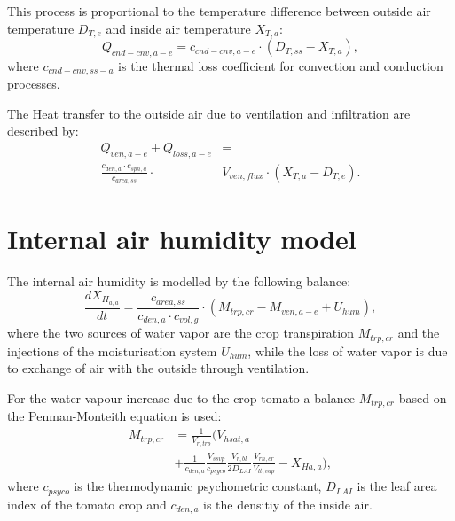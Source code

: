 This process is proportional to the temperature difference between outside air temperature $D_{T,e}$ and inside air temperature $X_{T,a}$:
\begin{equation}\label{eq:a-e}
Q_{cnd-cnv,a-e} = c_{cnd-cnv,a-e} \cdot (D_{T,ss}-X_{T,a}),
\end{equation}
where $c_{cnd-cnv,ss-a}$ is the thermal loss coefficient for convection and conduction processes.

The Heat transfer to the outside air due to ventilation and infiltration are described by:
\begin{equation}\label{eq:loss}
\begin{split}
Q_{ven,a-e} + Q_{loss,a-e}& = \\
\frac{c_{den,a} \cdot c_{sph,a}}{c_{area,ss}} \cdot &V_{ven,flux} \cdot (X_{T,a}-D_{T,e}).
\end{split}
\end{equation}

\section{Internal air humidity model}
\label{sec:hum}
The internal air humidity is modelled by the following balance:
\begin{equation}\label{eq:hum}
\frac{dX_{H_{a,a}}}{dt} = \frac{c_{area,ss}}{c_{den,a} \cdot c_{vol,g}} \cdot \left(M_{trp,cr}-M_{ven,a-e}+U_{hum}\right),
\end{equation}
where the two sources of water vapor are the crop transpiration $M_{trp,cr}$ and the injections of the moisturisation system $U_{hum}$, while the loss of water vapor is due to exchange of air with the outside through ventilation.

For the water vapour increase due to the crop tomato a balance $M_{trp,cr}$ based on the Penman-Monteith equation is used:
\begin{equation}\label{eq:crtp}
\begin{split}
M_{trp,cr} &= \frac{1}{V_{r,trp}}\Big(V_{hsat,a} \\
           &+ \frac{1}{c_{den,a}}\frac{V_{ssvp}}{c_{psyco}}\frac{V_{r,bl}}{2D_{LAI}}\frac{V_{rn,cr}}{V_{lt,vap}}-X_{Ha,a} \Big),
\end{split}
\end{equation}
where $c_{psyco}$ is the thermodynamic psychometric constant, $D_{LAI}$ is the leaf area index of the tomato crop and $c_{den,a}$ is the densitiy of the inside air.


